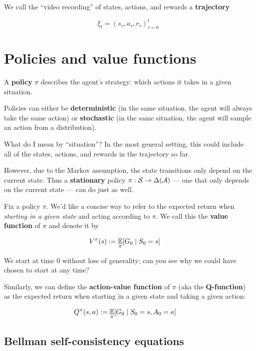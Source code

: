 \documentclass[../main/main]{subfiles}
\begin{document}
We call the ``video recording'' of states, actions, and rewards a \textbf{trajectory}

\[
    \xi_t = (s_\tau, a_\tau, r_\tau)_{\tau=0}^t
\]


\section{Policies and value functions}

A \textbf{policy} $\pi$ describes the agent's strategy: which actions it takes in a given situation.

Policies can either be \textbf{deterministic} (in the same situation, the agent will always take the same action) or \textbf{stochastic} (in the same situation, the agent will sample an action from a distribution).

What do I mean by ``situation''? In the most general setting, this could include all of the states, actions, and rewards in the trajectory so far.

However, due to the Markov assumption, the state transitions only depend on the current state. Thus a \textbf{stationary} policy $\pi : \mathcal{S} \to \Delta(\mathcal{A})$ --- one that only depends on the current state --- can do just as well.

Fix a policy $\pi$. We'd like a concise way to refer to the expected return when \emph{starting in a given state} and acting according to $\pi$. We call this the \textbf{value function} of $\pi$ and denote it by

\begin{align*}
    V^\pi(s) &:= \E_\pi [G_0 \mid S_0 = s] %
\end{align*}

We start at time $0$ without loss of generality; can you see why we could have chosen to start at any time?

Similarly, we can define the \textbf{action-value function} of $\pi$ (aka the \textbf{Q-function}) as the expected return when starting in a given state and taking a given action:

\begin{align*}
    Q^\pi(s, a) &:= \E_\pi [G_0 \mid S_0 = s, A_0 = a] %
\end{align*}

\subsection{Bellman self-consistency equations}
\end{document}
